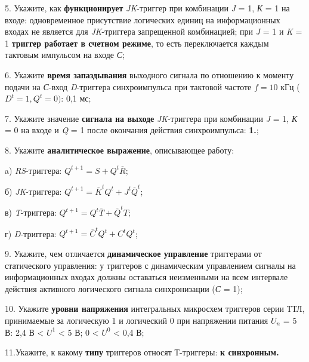 \documentclass[bachelor, och, otchet, hidelinks]{SCWorks}
\begin{document}
\par 5. Укажите, как \textbf{функционирует} \textit{JK}-триггер при комбинации \textit{J} = 1, 
\textit{К} = 1 на входе: одновременное присутствие логических единиц на информационных входах не является для 
\textit{JK}-триггера запрещенной комбинацией; при \textit{J} = 1 и \textit{K} = 1 \textbf{триггер работает в 
счетном режиме}, то есть переключается каждым тактовым импульсом на входе \textit{С};

\par 6. Укажите \textbf{время запаздывания} выходного сигнала по отношению к моменту подачи на \textit{С}-вход 
\textit{D}-триггера синхроимпульса при тактовой частоте $ f = 10 $ кГц ($ D^t = 1, Q^t = 0) $: 0,1 мс;

\par 7. Укажите значение \textbf{сигнала на выходе} \textit{JK}-триггера при комбинации \textit{J} = 1, 
\textit{К} = 0 на входе и \textit{Q} = 1 после окончания действия синхроимпульса: \textbf{1.};

\par 8. Укажите \textbf{аналитическое выражение}, описывающее работу:
\par a) \textit{RS}-триггера: $ Q^{t + 1} = S + Q^t \overline{R} $;
\par б) \textit{JK}-триггера: $ Q^{t + 1} = \overline{K}^t Q^t + J^t \overline{Q}^t $;
\par в) \textit{T}-триггера: $ Q^{t + 1} = Q^t \overline{T} + \overline{Q}^t T $;
\par г) \textit{D}-триггера: $ Q^{t + 1} = \overline{C}^t Q^t + C^t Q^t $;

\par 9. Укажите, чем отличается \textbf{динамическое управление} триггерами от статического управления: у 
триггеров с динамическим управлением сигналы на информационных входах должны оставаться неизменными на всем 
интервале действия активного логического сигнала синхронизации (\textit{С} = 1);

\par 10. Укажите \textbf{уровни напряжения} интегральных микросхем триггеров серии ТТЛ, принимаемые за логическую 
1 и логический 0 при напряжении питания $ U_n $ = 5 В: 2,4 В < $ U^1 $ < 5 В; 0 < $ U^0 $ < 0,4 В;

\par 11.Укажите, к какому \textbf{типу} триггеров относят Т-триггеры: \textbf{к синхронным.}

\conclusion
\end{document}
